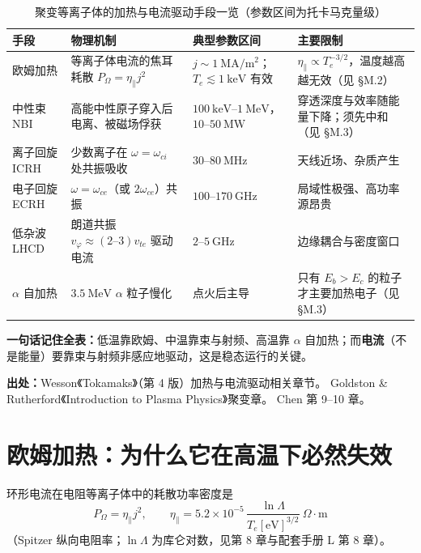 \begin{table}[htbp]
\centering
\small
\caption{聚变等离子体的加热与电流驱动手段一览（参数区间为托卡马克量级）}
\label{tab:app-m-heating}
\begin{tabular}{@{}p{2.3cm}p{4.7cm}p{4.2cm}p{5.0cm}@{}}
\toprule
手段 & 物理机制 & 典型参数区间 & 主要限制 \\
\midrule
欧姆加热 & 等离子体电流的焦耳耗散 $P_\Omega=\eta_\parallel j^2$ & $j\sim1\ \mathrm{MA/m^2}$；$T_e\lesssim1\ \mathrm{keV}$ 有效 & $\eta_\parallel\propto T_e^{-3/2}$，温度越高越无效（见 \S M.2） \\
中性束 NBI & 高能中性原子穿入后电离、被磁场俘获 & $100\ \mathrm{keV}$--$1\ \mathrm{MeV}$，$10$--$50\ \mathrm{MW}$ & 穿透深度与效率随能量下降；须先中和（见 \S M.3） \\
离子回旋 ICRH & 少数离子在 $\omega=\omega_{ci}$ 处共振吸收 & $30$--$80\ \mathrm{MHz}$ & 天线近场、杂质产生 \\
电子回旋 ECRH & $\omega=\omega_{ce}$（或 $2\omega_{ce}$）共振 & $100$--$170\ \mathrm{GHz}$ & 局域性极强、高功率源昂贵 \\
低杂波 LHCD & 朗道共振 $v_\varphi\approx(2\text{--}3)v_{te}$ 驱动电流 & $2$--$5\ \mathrm{GHz}$ & 边缘耦合与密度窗口 \\
$\alpha$ 自加热 & $3.5\ \mathrm{MeV}$ $\alpha$ 粒子慢化 & 点火后主导 & 只有 $E_b>E_c$ 的粒子才主要加热电子（见 \S M.3） \\
\bottomrule
\end{tabular}
\end{table}

\textbf{一句话记住全表：}低温靠欧姆、中温靠束与射频、高温靠 $\alpha$ 自加热；而\textbf{电流}（不是能量）要靠束与射频非感应地驱动，这是稳态运行的关键。

{\footnotesize
\textbf{出处：}Wesson《Tokamaks》（第 4 版）加热与电流驱动相关章节。
Goldston \& Rutherford《Introduction to Plasma Physics》聚变章。
Chen 第 9--10 章。
}


\section{欧姆加热：为什么它在高温下必然失效}

环形电流在电阻等离子体中的耗散功率密度是
\begin{equation}
P_\Omega=\eta_\parallel j^2,\qquad
\eta_\parallel=5.2\times10^{-5}\,\frac{\ln\Lambda}{T_e[\mathrm{eV}]^{3/2}}\ \Omega\cdot\mathrm{m}
\label{eq:app-m-spitzer}
\end{equation}
（Spitzer 纵向电阻率；$\ln\Lambda$ 为库仑对数，见第 8 章与配套手册 L 第 8 章）。

